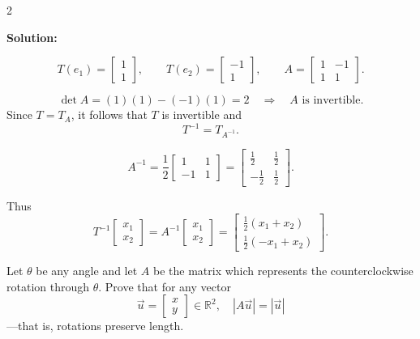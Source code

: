 \documentclass[8pt]{extarticle}
\begin{document}
\begin{multicols}{2}
\begin{tcolorbox}[title=Problem 6 — Original Statement and Solution]
\bigskip
\noindent
\textbf{Solution:}

\[
T(e_{1}) = \begin{bmatrix}1\\1\end{bmatrix},
\qquad
T(e_{2}) = \begin{bmatrix}-1\\1\end{bmatrix},
\qquad
A = \begin{bmatrix}1 & -1\\ 1 & 1\end{bmatrix}.
\]

\[
\det A = (1)(1) - (-1)(1) = 2 \quad \Rightarrow \quad A \text{ is invertible.}
\]
Since \(T = T_{A}\), it follows that \(T\) is invertible and
\[
T^{-1} = T_{A^{-1}}.
\]

\[
A^{-1} = \frac{1}{2}
\begin{bmatrix}
1 & 1\\
-1 & 1
\end{bmatrix}
=
\begin{bmatrix}
\tfrac{1}{2} & \tfrac{1}{2}\\
-\tfrac{1}{2} & \tfrac{1}{2}
\end{bmatrix}.
\]

Thus
\[
T^{-1}
\begin{bmatrix}
x_{1}\\ x_{2}
\end{bmatrix}
=
A^{-1}
\begin{bmatrix}
x_{1}\\ x_{2}
\end{bmatrix}
=
\begin{bmatrix}
\tfrac{1}{2}(x_{1}+x_{2})\\[6pt]
\tfrac{1}{2}(-x_{1}+x_{2})
\end{bmatrix}.
\]
\end{tcolorbox}

\begin{tcolorbox}[title=Problem 7 — Original Statement and Solution]
\noindent
Let \(\theta\) be any angle and let \(A\) be the matrix which represents the counterclockwise rotation through \(\theta\).  
Prove that for any vector
\[
\vec{u} =
\begin{bmatrix} x\\ y \end{bmatrix} \in \mathbb{R}^{2},
\quad
|A\vec{u}| = |\vec{u}|
\]
—that is, rotations preserve length.


\end{tcolorbox}
\end{multicols}
\end{document}
